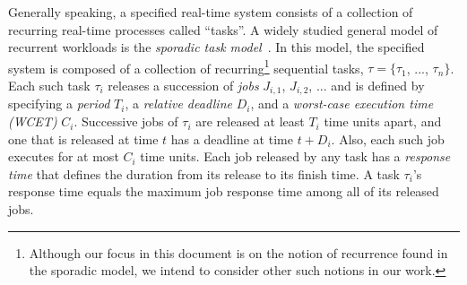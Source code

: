 Generally speaking, a specified real-time system consists of a collection of recurring real-time processes called ``tasks''. %
A widely studied general model of recurrent workloads is the \textit{sporadic task model}~\cite{sporadic}. In this model, the specified system is composed of a collection of recurring\footnote{Although our focus in this document is on the notion of recurrence found in the sporadic model, we intend to consider other such notions in our work.} %
sequential tasks, $\tau = \lbrace \tau_1$, ..., $\tau_n \rbrace$. Each such task $\tau_i$ releases a succession of \textit{jobs} $J_{i,1}$, $J_{i,2}$, ... and is defined by specifying a \textit{period} $T_i$, a \textit{relative deadline} $D_i$, and a \textit{worst-case execution time (WCET)} $C_i$. Successive jobs of $\tau_i$ are released at least $T_i$ time units apart, and one that is released at time $t$ has a deadline at time $t+D_i$. Also, each such job executes for at most $C_i$ time units. %
Each job released by any task has a \textit{response time} that defines the duration from its release to its finish time. A task $\tau_i$'s response time equals the maximum job response time among all of its released jobs. 


